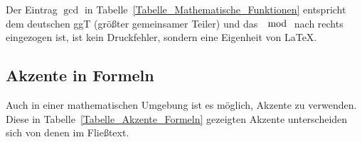 \documentclass[a4paper,10pt,twoside]{scrbook}
\begin{document}
{\begin{table}[h!tb]
\end{table}

Der Eintrag $\gcd$ in Tabelle~\ref{Tabelle_Mathematische_Funktionen} entspricht dem 
deutschen ggT (größter gemeinsamer Teiler) und das $\mod$ nach 
rechts eingezogen ist, ist kein Druckfehler, sondern eine Eigenheit von \LaTeX.


\subsection{Akzente in Formeln}


Auch in einer mathematischen Umgebung ist es 
möglich, Akzente zu verwenden. Diese in Tabelle~\ref{Tabelle_Akzente_Formeln} 
gezeigten Akzente unterscheiden sich von denen im Fließtext.


}
\end{document}
